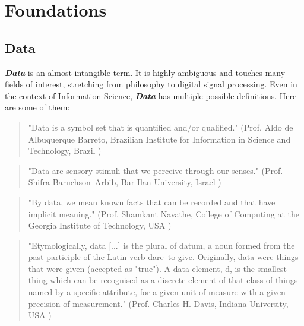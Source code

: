 \documentclass[a4paper,english,twoside,BCOR1.5cm,headsepline,DIV12,appendixprefix,final,12pt]{scrbook}
\newcommand{\provenance}{{\ttfamily\scshape\bfseries provenance}\xspace}
\newcommand{\licensing}{{\ttfamily\scshape\bfseries licensing}\xspace}
\newcommand{\access}{{\ttfamily\scshape\bfseries access}\xspace}
\newcommand{\extensibility}{{\ttfamily\scshape\bfseries extensibility}\xspace}
\newcommand{\interoperability}{{\ttfamily\scshape\bfseries interoperability}\xspace}
\newcommand{\cmdi}{{\scshape\bfseries cmdi}\xspace}
\newcommand{\dmp}{{\scshape\bfseries dmp}\xspace}
\newcommand{\important}[1]{\textbf{\textit{#1}}}
\begin{document}


\chapter{Foundations}
\label{chap:foundations}

\section{Data}
\label{sec:data}
\important{Data} is an almost intangible term. It is highly ambiguous and touches many fields of interest, stretching from philosophy to digital signal processing. Even in the context of Information Science, \important{Data} has multiple possible definitions. Here are some of them:

\begin{quote}
"Data is a symbol set that is quantified and/or qualified." (Prof. Aldo de Albuquerque Barreto, Brazilian Institute for Information in Science
and Technology, Brazil \cite{Zins2007})
\end{quote}

\begin{quote}
"Data are sensory stimuli that we perceive through our senses." (Prof. Shifra Baruchson–Arbib, Bar Ilan University, Israel \cite{Zins2007})
\end{quote}

\begin{quote}
"By data, we mean known facts that can be recorded and that have implicit meaning." (Prof. Shamkant Navathe, College of Computing at the Georgia Institute of Technology, USA \cite{elmasri06db})
\end{quote}

\begin{quote}
"Etymologically, data [...] 
is the plural of datum, a noun formed from the
past participle of the Latin verb dare–to give. Originally,
data were things that were given (accepted as "true"). A data
element, d, is the smallest thing which can be recognised as
a discrete element of that class of things named by a specific
attribute, for a given unit of measure with a given precision
of measurement." (Prof. Charles H. Davis, Indiana University, USA \cite{Zins2007})
\end{quote}
\end{document}

